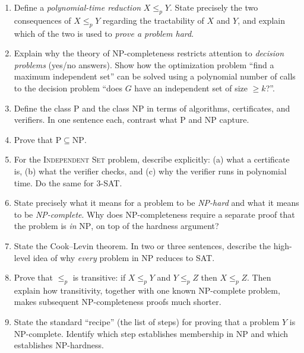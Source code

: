 \documentclass[11pt]{article}
\begin{document}
\begin{enumerate}[label=\textbf{A\arabic*.}, leftmargin=2.2em]

\item Define a \emph{polynomial-time reduction} $X \le_p Y$. State precisely the two
consequences of $X \le_p Y$ regarding the tractability of $X$ and $Y$, and explain which
of the two is used to \emph{prove a problem hard}.

\item Explain why the theory of NP-completeness restricts attention to \emph{decision
problems} (yes/no answers). Show how the optimization problem ``find a maximum independent
set'' can be solved using a polynomial number of calls to the decision problem ``does $G$
have an independent set of size $\ge k$?''.

\item Define the class $\mathrm{P}$ and the class $\mathrm{NP}$ in terms of algorithms,
certificates, and verifiers. In one sentence each, contrast what $\mathrm{P}$ and
$\mathrm{NP}$ capture.

\item Prove that $\mathrm{P} \subseteq \mathrm{NP}$.

\item For the \textsc{Independent Set} problem, describe explicitly: (a) what a certificate
is, (b) what the verifier checks, and (c) why the verifier runs in polynomial time. Do the
same for \textsc{3-SAT}.

\item State precisely what it means for a problem to be \emph{NP-hard} and what it means to
be \emph{NP-complete}. Why does NP-completeness require a separate proof that the problem is
\emph{in} $\mathrm{NP}$, on top of the hardness argument?

\item State the Cook--Levin theorem. In two or three sentences, describe the high-level
idea of why \emph{every} problem in $\mathrm{NP}$ reduces to \textsc{SAT}.

\item Prove that $\le_p$ is transitive: if $X \le_p Y$ and $Y \le_p Z$ then $X \le_p Z$.
Then explain how transitivity, together with one known NP-complete problem, makes
subsequent NP-completeness proofs much shorter.

\item State the standard ``recipe'' (the list of steps) for proving that a problem $Y$ is
NP-complete. Identify which step establishes membership in $\mathrm{NP}$ and which
establishes NP-hardness.


\end{enumerate}
\end{document}

